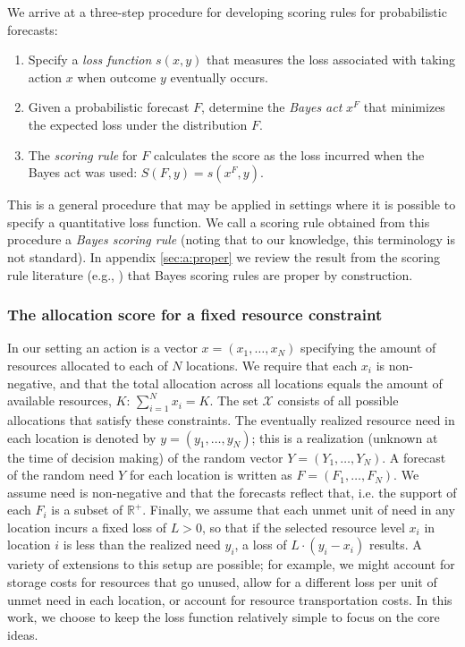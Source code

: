 \documentclass{article}
\begin{document}
We arrive at a three-step procedure for developing scoring rules for probabilistic forecasts:
\begin{enumerate}
  \item Specify a \emph{loss function} $s(x, y)$ that measures the loss associated with taking action $x$ when outcome $y$
    eventually occurs.
  \item Given a probabilistic forecast $F$, determine the \emph{Bayes act} $x^F$ that minimizes the expected loss under
    the distribution $F$.
  \item The \emph{scoring rule} for $F$ calculates the score as the loss incurred when the Bayes act was used: 
    $S(F, y) = s(x^F, y)$.
\end{enumerate}
This is a general procedure that may be applied in settings where it is possible to specify a quantitative loss
function. We call a scoring rule obtained from this procedure a \emph{Bayes scoring rule} (noting that to our knowledge, 
this terminology is not standard).  In appendix \ref{sec:a:proper} we review the
result from the scoring rule literature (e.g., \cite{dawid2007geometry,gneiting2007strictly}) that Bayes scoring
rules are proper by construction.

\subsubsection{The allocation score for a fixed resource constraint}
\label{sec:methods.detailed.specific_allocation}

In our setting an action is a vector $x = (x_1, \ldots, x_N)$ specifying the amount of resources allocated to each of
$N$ locations. We require that each $x_i$ is non-negative, and that the total allocation across
all locations equals the amount of available resources, $K$: $\sum_{i=1}^N x_i = K$. The set $\mathcal{X}$ consists of
all possible allocations that satisfy these constraints. The eventually realized resource need in each location is
denoted by $y = (y_1, \ldots, y_N)$; this is a realization (unknown at the
time of decision making) of the random vector $Y = (Y_1, \ldots, Y_N)$. A forecast of the random need $Y$ for each
location is written as $F = (F_1, \ldots, F_N)$. We assume need is non-negative and that the forecasts reflect that, i.e. the
support of each $F_i$ is a subset of $\mathbb{R}^+$. Finally, we assume that each unmet unit of need in any location
incurs a fixed loss of $L>0$, so that if the selected resource level $x_i$ in location $i$ is less than the realized
need $y_i$, a loss of $L \cdot (y_i - x_i)$ results. A variety of extensions to this setup are possible; for example, we
might account for storage costs for resources that go unused, allow for a different loss per unit of unmet need in each
location, or account for resource transportation costs. In this work, we choose to keep the loss function relatively
simple to focus on the core ideas.
\end{document}
